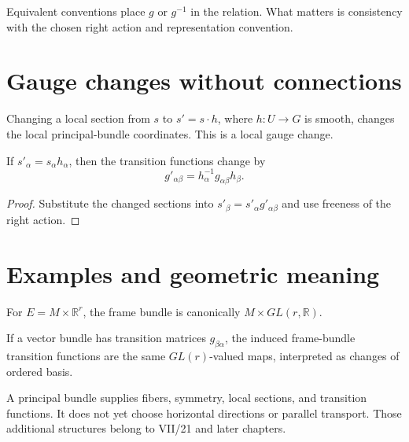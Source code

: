 \begin{remark}\label{rem:vii08-associated-convention}
Equivalent conventions place \(g\) or \(g^{-1}\) in the relation. What matters is consistency with the chosen right action and representation convention.
\end{remark}

\section{Gauge changes without connections}
\begin{definition}\label{def:vii08-gauge-change}
Changing a local section from \(s\) to \(s'=s\cdot h\), where \(h:U\to G\) is smooth, changes the local principal-bundle coordinates. This is a local gauge change.
\end{definition}

\begin{proposition}\label{prop:vii08-gauge-transition}
If \(s'_\alpha=s_\alpha h_\alpha\), then the transition functions change by
\[
g'_{\alpha\beta}=h_\alpha^{-1}g_{\alpha\beta}h_\beta.
\]
\end{proposition}
\begin{proof}
Substitute the changed sections into \(s'_\beta=s'_\alpha g'_{\alpha\beta}\) and use freeness of the right action.
\end{proof}

\section{Examples and geometric meaning}
\begin{example}\label{ex:vii08-trivial-frame}
For \(E=M\times\mathbb R^r\), the frame bundle is canonically \(M\times GL(r,\mathbb R)\).
\end{example}

\begin{example}\label{ex:vii08-frame-transition}
If a vector bundle has transition matrices \(g_{\beta\alpha}\), the induced frame-bundle transition functions are the same \(GL(r)\)-valued maps, interpreted as changes of ordered basis.
\end{example}

\begin{warning}\label{warning:vii08-no-connection}
A principal bundle supplies fibers, symmetry, local sections, and transition functions. It does not yet choose horizontal directions or parallel transport. Those additional structures belong to VII/21 and later chapters.
\end{warning}

